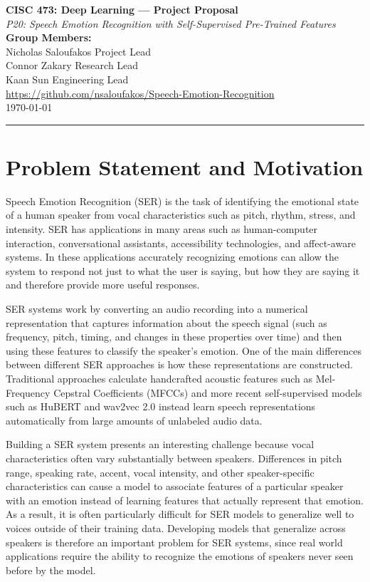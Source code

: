 \documentclass[11pt, letterpaper]{article}
\begin{document}
{\centering
  {\Large\textbf{CISC 473: Deep Learning --- Project Proposal}}\\[0.5em]
  {\large\textit{P20: Speech Emotion Recognition with Self-Supervised Pre-Trained Features}}\\[0.4em]
  \textbf{Group Members:}\\{}
  Nicholas Saloufakos  \quad Project Lead\\{}
  Connor Zakary  \quad Research Lead \\{}
  Kaan Sun  \quad Engineering Lead \\{}
  \url{https://github.com/nsaloufakos/Speech-Emotion-Recognition}\\[0.3em]
  \today\\[0.4em]
  \rule{\linewidth}{0.4pt}
}

\section{Problem Statement and Motivation}

Speech Emotion Recognition (SER) is the task of identifying the emotional state of a human speaker from vocal characteristics such as pitch, rhythm, stress, and intensity. SER has applications in many areas such as human-computer interaction, conversational assistants, accessibility technologies, and affect-aware systems. In these applications accurately recognizing emotions can allow the system to respond not just to what the user is saying, but how they are saying it and therefore provide more useful responses. 

SER systems work by converting an audio recording into a numerical representation that captures information about the speech signal (such as frequency, pitch, timing, and changes in these properties over time) and then using these features to classify the speaker's emotion. One of the main differences between different SER approaches is how these representations are constructed. Traditional approaches calculate handcrafted acoustic features such as Mel-Frequency Cepstral Coefficients (MFCCs) and more recent self-supervised models such as HuBERT and wav2vec 2.0 instead learn speech representations automatically from large amounts of unlabeled audio data.

Building a SER system presents an interesting challenge because vocal characteristics often vary substantially between speakers. Differences in pitch range, speaking rate, accent, vocal intensity, and other speaker-specific characteristics can cause a model to associate features of a particular speaker with an emotion instead of learning features that actually represent that emotion. As a result, it is often particularly difficult for SER models to generalize well to voices outside of their training data. Developing models that generalize across speakers is therefore an important problem for SER systems, since real world applications require the ability to recognize the emotions of speakers never seen before by the model.
\end{document}
